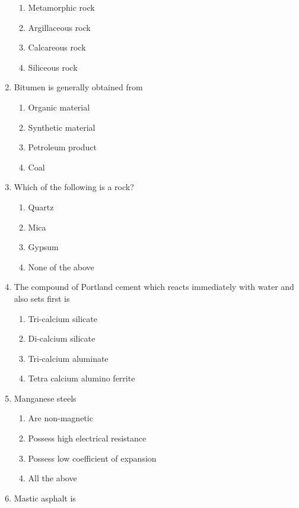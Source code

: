\documentclass[11pt,a4paper]{article}
\begin{document}
\begin{enumerate}
\begin{enumerate}[label=\Alph*.]
\item{Metamorphic rock}
\item{Argillaceous rock}
\item{Calcareous rock}
\item{Siliceous rock}
\end{enumerate}
\item{Bitumen is generally obtained from}
\begin{enumerate}[label=\Alph*.]
\item{Organic material}
\item{Synthetic material}
\item{Petroleum product}
\item{Coal}
\end{enumerate}
\item{Which of the following is a rock?}
\begin{enumerate}[label=\Alph*.]
\item{Quartz}
\item{Mica}
\item{Gypsum}
\item{None of the above}
\end{enumerate}
\item{The compound of Portland cement which reacts immediately with water and also sets first is}
\begin{enumerate}[label=\Alph*.]
\item{Tri-calcium silicate}
\item{Di-calcium silicate}
\item{Tri-calcium aluminate}
\item{Tetra calcium alumino ferrite}
\end{enumerate}
\item{Manganese steels}
\begin{enumerate}[label=\Alph*.]
\item{Are non-magnetic}
\item{Possess high electrical resistance}
\item{Possess low coefficient of expansion}
\item{All the above}
\end{enumerate}
\item{Mastic asphalt is}
\\
\end{enumerate}
\end{document}
